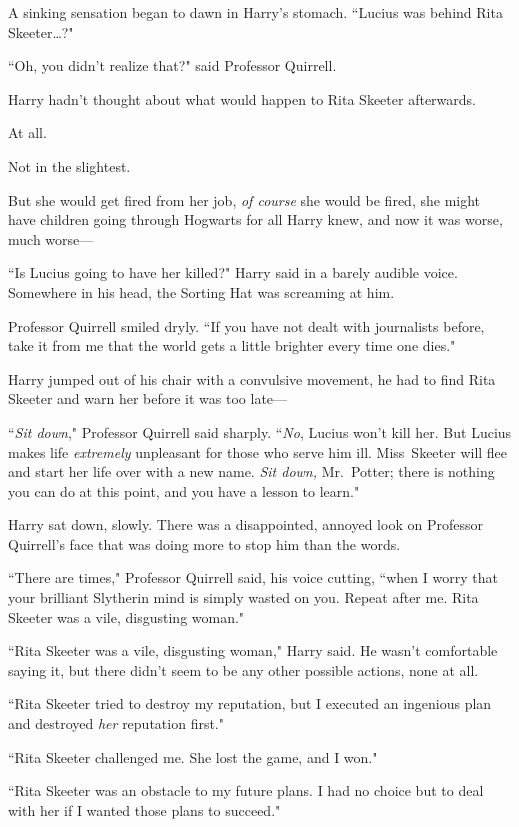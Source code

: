 A sinking sensation began to dawn in Harry's stomach. ``Lucius was behind Rita Skeeter{\ldots}?"

``Oh, you didn't realize that?" said Professor Quirrell.

Harry hadn't thought about what would happen to Rita Skeeter afterwards.

At all.

Not in the slightest.

But she would get fired from her job, \emph{of course} she would be fired, she might have children going through Hogwarts for all Harry knew, and now it was worse, much worse---

``Is Lucius going to have her killed?" Harry said in a barely audible voice. Somewhere in his head, the Sorting Hat was screaming at him.

Professor Quirrell smiled dryly. ``If you have not dealt with journalists before, take it from me that the world gets a little brighter every time one dies."

Harry jumped out of his chair with a convulsive movement, he had to find Rita Skeeter and warn her before it was too late---

``\emph{Sit down}," Professor Quirrell said sharply. ``\emph{No}, Lucius won't kill her. But Lucius makes life \emph{extremely} unpleasant for those who serve him ill. Miss~Skeeter will flee and start her life over with a new name. \emph{Sit down,} Mr.~Potter; there is nothing you can do at this point, and you have a lesson to learn."

Harry sat down, slowly. There was a disappointed, annoyed look on Professor Quirrell's face that was doing more to stop him than the words.

``There are times," Professor Quirrell said, his voice cutting, ``when I worry that your brilliant Slytherin mind is simply wasted on you. Repeat after me. Rita Skeeter was a vile, disgusting woman."

``Rita Skeeter was a vile, disgusting woman," Harry said. He wasn't comfortable saying it, but there didn't seem to be any other possible actions, none at all.

``Rita Skeeter tried to destroy my reputation, but I executed an ingenious plan and destroyed \emph{her} reputation first."

``Rita Skeeter challenged me. She lost the game, and I won."

``Rita Skeeter was an obstacle to my future plans. I had no choice but to deal with her if I wanted those plans to succeed."

